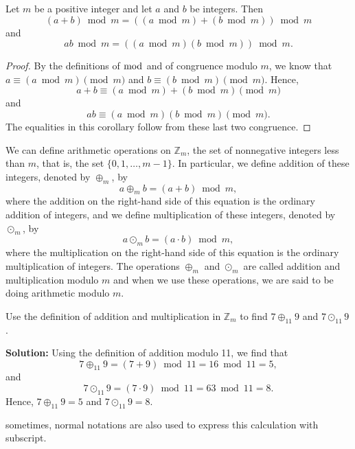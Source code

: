         \begin{corollary}
            Let $m$ be a positive integer and let $a$ and $b$ be integers. Then
            \begin{equation*}
                (a + b) \bmod m = ((a \bmod m) + (b \bmod m)) \bmod m
            \end{equation*}
            and
            \begin{equation*}
                ab \bmod m = ((a \bmod m)(b \bmod m)) \bmod m.
            \end{equation*}
            \end{corollary}
            
            \begin{proof}
            By the definitions of $\bmod$ and of congruence modulo $m$, we know that $a \equiv (a \bmod m) \pmod{m}$ and $b \equiv (b \bmod m) \pmod{m}$. Hence,
            \begin{equation*}
                a + b \equiv (a \bmod m) + (b \bmod m) \pmod{m}
            \end{equation*}
            and
            \begin{equation*}
                ab \equiv (a \bmod m)(b \bmod m) \pmod{m}.
            \end{equation*}
            The equalities in this corollary follow from these last two congruence.
            \end{proof}

            We can define arithmetic operations on \( \mathbb{Z}_m \), the set of nonnegative integers less than \( m \), that is, the set \( \{0, 1, \ldots, m - 1\} \). In particular, we define addition of these integers, denoted by \( \oplus_m \), by
        \[
        a \oplus_m b = (a + b) \bmod m,
        \]
        where the addition on the right-hand side of this equation is the ordinary addition of integers, and we define multiplication of these integers, denoted by \( \odot_m \), by
        \[
        a \odot_m b = (a \cdot b) \bmod m,
        \]
        where the multiplication on the right-hand side of this equation is the ordinary multiplication of integers. The operations \( \oplus_m \) and \( \odot_m \) are called addition and multiplication modulo \( m \) and when we use these operations, we are said to be doing arithmetic modulo \( m \).

        \begin{example}
        Use the definition of addition and multiplication in \( \mathbb{Z}_m \) to find \( 7 \oplus_{11} 9 \) and \( 7 \odot_{11} 9 \).

        \textbf{Solution:} Using the definition of addition modulo 11, we find that
        \[
        7 \oplus_{11} 9 = (7 + 9) \bmod 11 = 16 \bmod 11 = 5,
        \]
        and
        \[
        7 \odot_{11} 9 = (7 \cdot 9) \bmod 11 = 63 \bmod 11 = 8.
        \]
        Hence, \( 7 \oplus_{11} 9 = 5 \) and \( 7 \odot_{11} 9 = 8 \).
        \end{example}
        \begin{remark}
            sometimes, normal notations are also used to express this calculation with subscript.
        \end{remark}
    
